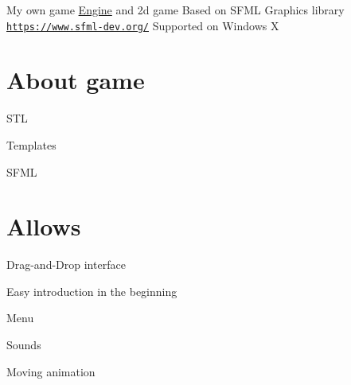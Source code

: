My own game \hyperlink{class_engine}{Engine} and 2d game Based on S\+F\+ML Graphics library \href{https://www.sfml-dev.org/}{\tt https\+://www.\+sfml-\/dev.\+org/} Supported on Windows X \section*{About game}


\begin{DoxyItemize}
\item S\+TL
\item Templates
\item S\+F\+ML \section*{Allows}
\end{DoxyItemize}


\begin{DoxyItemize}
\item Drag-\/and-\/\+Drop interface
\item Easy introduction in the beginning
\item Menu
\item Sounds
\item Moving animation
\end{DoxyItemize}

 
